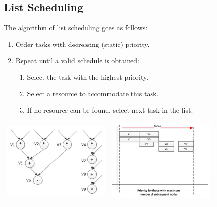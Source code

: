 	\subsection{List Scheduling}
		The algorithm of list scheduling goes as follows:
		
		\begin{enumerate}
			\item Order tasks with decreasing (static) priority.
			\item Repeat until a valid schedule is obtained:
			\begin{enumerate}
			  \item Select the task with the highest priority.
			  \item Select a resource to accommodate this task.
			  \item If no resource can be found, select next task in the list.
			\end{enumerate}
		\end{enumerate}
		
		\begin{table}[H]\centering
			\begin{tabular}{p{0.425\linewidth}p{0.425\linewidth}}
				\includegraphics[scale=0.8]{./pictures/listSchedDiag.png}
				& \includegraphics[scale=0.8]{./pictures/listSched.png}\\
			\end{tabular}
		\end{table}

